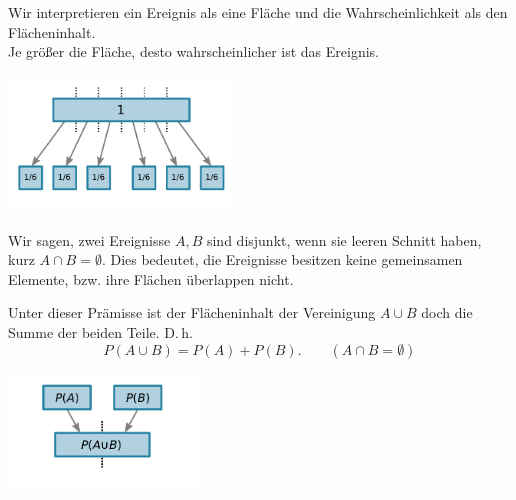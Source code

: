 \documentclass[9pt]{beamer}
\begin{document}
\begin{frame}[t]
\vspace{4em}
Wir interpretieren ein Ereignis als eine Fläche und die
Wahrscheinlichkeit als den Flächeninhalt.\\

\vspace{0.8em}
Je größer die Fläche,
desto wahrscheinlicher ist das Ereignis.\pause
\begin{center}
\includegraphics[width=60mm]{img/propability-area.pdf}
\end{center}
\end{frame}

\begin{frame}[t]
\vspace{4em}
Wir sagen, zwei Ereignisse $A,B$ sind disjunkt, wenn sie
leeren Schnitt haben, kurz $A\cap B=\emptyset$. Dies bedeutet, die
Ereignisse besitzen keine gemeinsamen Elemente, bzw. ihre Flächen
überlappen nicht.\pause

\vspace{0.8em}
Unter dieser Prämisse ist der Flächeninhalt der Vereinigung
$A\cup B$ doch die Summe der beiden Teile.\pause{} D.\,h.
\[P(A\cup B) = P(A) + P(B).\qquad (A\cap B=\emptyset)
\]\pause

\vspace{-2em}
\begin{center}
\includegraphics[width=50mm]{img/additivity.pdf}
\end{center}
\end{frame}
\end{document}
